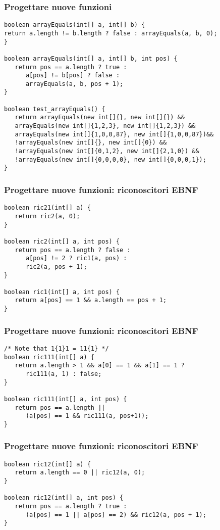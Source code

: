 \documentclass{beamer}
\begin{document}
\begin{frame}[fragile]
\frametitle{Progettare nuove funzioni}
\begin{verbatim}
boolean arrayEquals(int[] a, int[] b) {
return a.length != b.length ? false : arrayEquals(a, b, 0);
}

boolean arrayEquals(int[] a, int[] b, int pos) {
   return pos == a.length ? true :
      a[pos] != b[pos] ? false : 
      arrayEquals(a, b, pos + 1);
}

boolean test_arrayEquals() {
   return arrayEquals(new int[]{}, new int[]{}) &&
   arrayEquals(new int[]{1,2,3}, new int[]{1,2,3}) &&
   arrayEquals(new int[]{1,0,0,87}, new int[]{1,0,0,87})&&
   !arrayEquals(new int[]{}, new int[]{0}) &&
   !arrayEquals(new int[]{0,1,2}, new int[]{2,1,0}) &&
   !arrayEquals(new int[]{0,0,0,0}, new int[]{0,0,0,1});
}
\end{verbatim}
\end{frame}

\begin{frame}[fragile]
\frametitle{Progettare nuove funzioni: riconoscitori EBNF}
\begin{verbatim}
boolean ric21(int[] a) {
   return ric2(a, 0);
}

boolean ric2(int[] a, int pos) {
   return pos == a.length ? false :
      a[pos] != 2 ? ric1(a, pos) : 
      ric2(a, pos + 1);
}

boolean ric1(int[] a, int pos) {
   return a[pos] == 1 && a.length == pos + 1;
}
\end{verbatim}
\end{frame}

\begin{frame}[fragile]
\frametitle{Progettare nuove funzioni: riconoscitori EBNF}
\begin{verbatim}
/* Note that 1{1}1 = 11{1} */
boolean ric111(int[] a) {
   return a.length > 1 && a[0] == 1 && a[1] == 1 ?
      ric111(a, 1) : false;
}

boolean ric111(int[] a, int pos) {
   return pos == a.length ||
      (a[pos] == 1 && ric111(a, pos+1));
}
\end{verbatim}
\end{frame}

\begin{frame}[fragile]
\frametitle{Progettare nuove funzioni: riconoscitori EBNF}
\begin{verbatim}
boolean ric12(int[] a) {
   return a.length == 0 || ric12(a, 0);
}

boolean ric12(int[] a, int pos) {
   return pos == a.length ? true : 
      (a[pos] == 1 || a[pos] == 2) && ric12(a, pos + 1);
}
\end{verbatim}
\end{frame}
\end{document}
